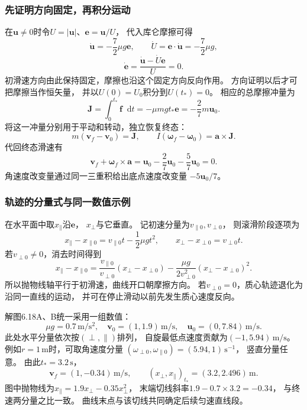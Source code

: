 \documentclass[UTF8,fontset=fandol,a4paper,11pt]{ctexart}
\newcommand{\dd}{\mathop{}\!\mathrm{d}}
\begin{document}
\subsubsection*{先证明方向固定，再积分运动}
在$\boldsymbol u\ne0$时令$U=|\boldsymbol u|$、$\boldsymbol e=\boldsymbol u/U$，
代入库仑摩擦可得
\[
\dot{\boldsymbol u}=-\frac72\mu g\boldsymbol e,
\qquad \dot U=\boldsymbol e\cdot\dot{\boldsymbol u}=-\frac72\mu g,
\]
\[
\dot{\boldsymbol e}
=\frac{\dot{\boldsymbol u}-\dot U\boldsymbol e}{U}=0.
\]
初滑速方向由此保持固定，摩擦也沿这个固定方向反向作用。
方向证明以后才可把摩擦当作恒矢量，
并以$U(0)=U_0$积分到$U(t_*)=0$。
相应的总摩擦冲量为
\[
\boldsymbol J=\int_0^{t_*}\boldsymbol f\dd t
=-\mu mg t_*\boldsymbol e=-\frac27m\boldsymbol u_0.
\]
将这一冲量分别用于平动和转动，独立恢复终态：
\[
m(\boldsymbol v_f-\boldsymbol v_0)=\boldsymbol J,
\qquad
I(\boldsymbol\omega_f-\boldsymbol\omega_0)
=\boldsymbol a\times\boldsymbol J.
\]
代回终态滑速有
\[
\boldsymbol v_f+\boldsymbol\omega_f\times\boldsymbol a
=\boldsymbol u_0-\frac27\boldsymbol u_0-\frac57\boldsymbol u_0=0.
\]
角速度改变量通过同一三重积给出底点速度改变量 $-5\boldsymbol u_0/7$。

\subsubsection*{轨迹的分量式与同一数值示例}
在水平面中取$x_\parallel$沿$\boldsymbol e$，
$x_\perp$与它垂直。
记初速分量为$v_{\parallel0},v_{\perp0}$，
则滚滑阶段逐项为
\[
x_\parallel-x_{\parallel0}=v_{\parallel0}t-\frac12\mu gt^2,
\qquad
x_\perp-x_{\perp0}=v_{\perp0}t.
\]
若$v_{\perp0}\ne0$，消去时间得到
\[
x_\parallel-x_{\parallel0}
=\frac{v_{\parallel0}}{v_{\perp0}}(x_\perp-x_{\perp0})
-\frac{\mu g}{2v_{\perp0}^2}(x_\perp-x_{\perp0})^2.
\]
所以抛物线轴平行于初滑速，曲线开口朝摩擦方向。
若$v_{\perp0}=0$，质心轨迹退化为沿同一直线的运动，
并可在停止滑动以前先发生质心速度反向。

解图6.18A、B统一采用一组数值：
\[
\mu g=0.7\,\mathrm{m/s^2},\quad
\boldsymbol v_0=(1,1.9)\,\mathrm{m/s},
\quad\boldsymbol u_0=(0,7.84)\,\mathrm{m/s}.
\]
此处水平分量依次按$(\perp,\parallel)$排列，
自旋最低点速度贡献为$(-1,5.94)\,\mathrm{m/s}$。
例如$r=1\,\mathrm m$时，可取角速度分量
$(\omega_{\perp0},\omega_{\parallel0})=(5.94,1)\,\mathrm{s^{-1}}$，
竖直分量任意。
由此$t_*=3.2\,\mathrm s$，
\[
\boldsymbol v_f=(1,-0.34)\,\mathrm{m/s},
\qquad (x_\perp,x_\parallel)_{t_*}=(3.2,2.496)\,\mathrm m.
\]
图中抛物线为$x_\parallel=1.9x_\perp-0.35x_\perp^2$，
末端切线斜率$1.9-0.7\times3.2=-0.34$，
与终速两分量之比一致。
曲线末点与该切线共同确定后续匀速直线段。
\end{document}
